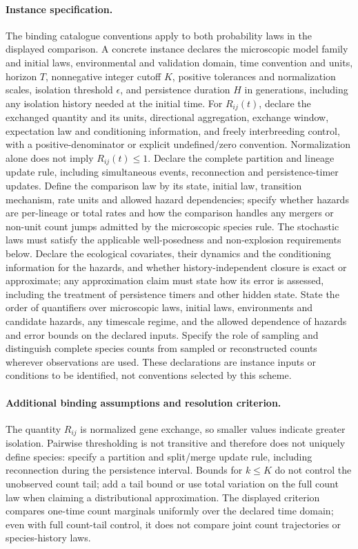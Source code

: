 \documentclass[11pt]{article}
\begin{document}
\paragraph{Instance specification.} The binding catalogue conventions apply to both probability laws in the displayed comparison. A concrete instance declares the microscopic model family and initial laws, environmental and validation domain, time convention and units, horizon $T$, nonnegative integer cutoff $K$, positive tolerances and normalization scales, isolation threshold $\epsilon$, and persistence duration $H$ in generations, including any isolation history needed at the initial time. For $R_{ij}(t)$, declare the exchanged quantity and its units, directional aggregation, exchange window, expectation law and conditioning information, and freely interbreeding control, with a positive-denominator or explicit undefined/zero convention. Normalization alone does not imply $R_{ij}(t)\le1$. Declare the complete partition and lineage update rule, including simultaneous events, reconnection and persistence-timer updates. Define the comparison law by its state, initial law, transition mechanism, rate units and allowed hazard dependencies; specify whether hazards are per-lineage or total rates and how the comparison handles any mergers or non-unit count jumps admitted by the microscopic species rule. The stochastic laws must satisfy the applicable well-posedness and non-explosion requirements below. Declare the ecological covariates, their dynamics and the conditioning information for the hazards, and whether history-independent closure is exact or approximate; any approximation claim must state how its error is assessed, including the treatment of persistence timers and other hidden state. State the order of quantifiers over microscopic laws, initial laws, environments and candidate hazards, any timescale regime, and the allowed dependence of hazards and error bounds on the declared inputs. Specify the role of sampling and distinguish complete species counts from sampled or reconstructed counts wherever observations are used. These declarations are instance inputs or conditions to be identified, not conventions selected by this scheme.
\paragraph{Additional binding assumptions and resolution criterion.} The quantity $R_{ij}$ is normalized gene exchange, so smaller values indicate greater isolation. Pairwise thresholding is not transitive and therefore does not uniquely define species: specify a partition and split/merge update rule, including reconnection during the persistence interval. Bounds for $k\leq K$ do not control the unobserved count tail; add a tail bound or use total variation on the full count law when claiming a distributional approximation. The displayed criterion compares one-time count marginals uniformly over the declared time domain; even with full count-tail control, it does not compare joint count trajectories or species-history laws.
\end{document}
